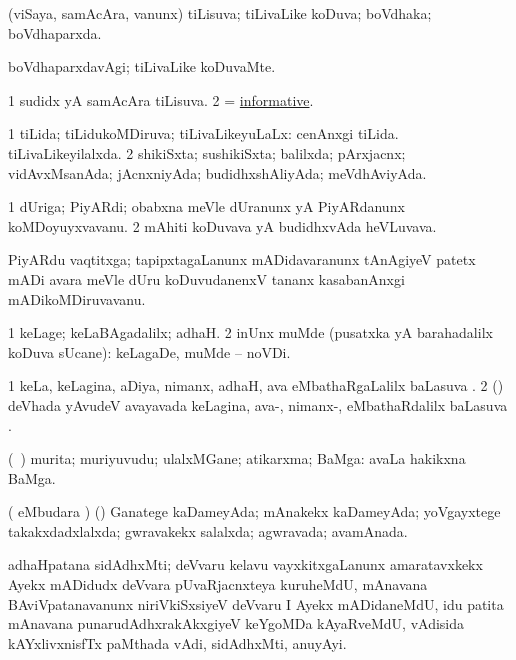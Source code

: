 \bentry
{}
\gl{\gu}
\bmng
(viSaya, samAcAra, \mo vanunx) tiLisuva; tiLivaLike koDuva; boVdhaka; boVdhaparxda. 
\emng
\eentry

\bentry
{}
\gl{\kirxvi}
\bmng
boVdhaparxdavAgi; tiLivaLike koDuvaMte. 
\emng
\eentry

\bentry
{}
\gl{\gu}
\bmng
\bnum
\num{1} sudidx yA samAcAra tiLisuva. 
\num{2}  = \hyperlink{informative}{informative}. 
\enum
\emng
\eentry

\bentry
{}
\gl{\gu}
\bmng
\bnum
\num{1} tiLida; tiLidukoMDiruva; tiLivaLikeyuLaLx:  cenAnxgi tiLida.  tiLivaLikeyilalxda. 
\num{2} shikiSxta; sushikiSxta; balilxda; pArxjacnx; vidAvxMsanAda; jAcnxniyAda; budidhxshAliyAda; meVdhAviyAda. 
\enum
\emng
\eentry

\bentry
{}
\gl{\nA}
\bmng
\bnum
\num{1} dUriga; PiyARdi; obabxna meVle dUranunx yA PiyARdanunx koMDoyuyxvavanu. 
\num{2} mAhiti koDuvava yA budidhxvAda heVLuvava. 
\enum
\emng

\noindent
\gl{\pagu}
\bmng
{} PiyARdu vaqtitxga; tapipxtagaLanunx mADidavaranunx tAnAgiyeV patetx mADi avara meVle dUru koDuvudanenxV tananx kasabanAnxgi mADikoMDiruvavanu. 
\emng
\eentry

\bentry
{}
\gl{\kirxvi}
\expl{\Latin }
\bmng
\bnum
\num{1} keLage; keLaBAgadalilx; adhaH. 
\num{2} inUnx muMde (pusatxka yA barahadalilx koDuva sUcane):  keLagaDe, muMde -- noVDi. 
\enum
\emng
\eentry

\bentry
{}
\gl{\sapUpa}
\bmng
\bnum
\num{1} keLa, keLagina, aDiya, nimanx, adhaH, ava eMbathaRgaLalilx baLasuva \sapUpa. 
\num{2} (\aMrashA) deVhada yAvudeV avayavada keLagina, ava-, nimanx-, eMbathaRdalilx baLasuva \sapUpa. 
\enum
\emng
\eentry

\bentry
{}
\gl{\nA}
\bmng
(\kanmu\ \nAyxshA) murita; muriyuvudu; ulalxMGane; atikarxma; BaMga:  avaLa hakikxna BaMga. 
\emng
\eentry

\bentry
{}
\gl{\Agu}
\bmng
( eMbudara \saMkiSx) (\AmA) Ganatege kaDameyAda; mAnakekx kaDameyAda; yoVgayxtege takakxdadxlalxda; gwravakekx salalxda; agwravada; avamAnada. 
\emng
\eentry

\bentry
{}
\gl{\nA}
\bmng
adhaHpatana sidAdhxMti; deVvaru kelavu vayxkitxgaLanunx amaratavxkekx Ayekx mADidudx deVvara pUvaRjacnxteya kuruheMdU, mAnavana BAviVpatanavanunx niriVkiSxsiyeV deVvaru I Ayekx mADidaneMdU, idu patita mAnavana punarudAdhxrakAkxgiyeV keYgoMDa kAyaRveMdU, vAdisida kAYxlivxnisfTx paMthada vAdi, sidAdhxMti, anuyAyi. 
\emng
\eentry

